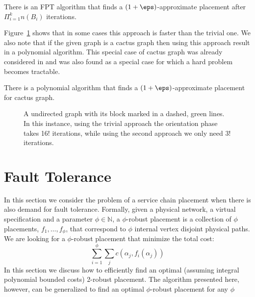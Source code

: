 \begin{theorem}
There is an FPT algorithm that finds a $(1+\eps)$-approximate placement after
$\Pi_{i = 1}^k n(B_i)$ iterations.
\end{theorem}

Figure~\ref{fig:or2} shows that in some cases this approach is faster than the trivial one.
We also note that if the given graph is a cactus graph then using this approach result in 
a polynomial algorithm.
This special case of cactus graph was already considered in \cite{Stefan} and was also found
as a special case for which a hard problem becomes tractable. 

\begin{theorem}
There is a polynomial algorithm that finds a $(1+\eps)$-approximate placement 
for cactus graph.
\end{theorem}


\begin{figure}
\begin{center}
\end{center}
\caption{
A undirected graph with its block marked in a dashed, green lines.
In this instance, using the trivial approach the orientation phase takes 16! iterations,
while using the second approach we only need 3! iterations.
\label{fig:or2}
}
\end{figure}   


\section{Fault Tolerance}
In this section we consider the problem of a service chain placement when there 
is also demand for fault tolerance.
Formally, given a physical network, a virtual specification and a parameter 
$\phi \in \mathbb{N}$, a $\phi$-robust placement is a collection of $\phi$ placements,
$f_1,\ldots,f_\phi$,
that correspond to $\phi$ internal vertex disjoint physical paths. 
We are looking for a $\phi$-robust placement that minimize the total cost:
$$
\sum_{i = 1}^\phi \sum_j c(\alpha_j,f_i(\alpha_j))
$$
In this section we discuss how to efficiently find an optimal 
(assuming integral polynomial bounded costs) 2-robust placement.
The algorithm presented here, however, can be generalized to find an optimal $\phi$-robust
placement for any $\phi$

